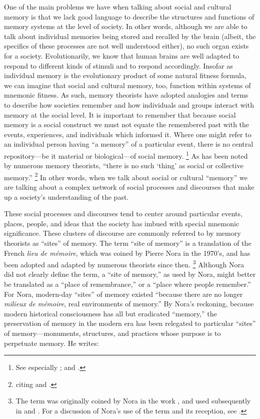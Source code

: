 One of the main problems we have when talking about social and cultural memory is that we lack good language to describe the structures and functions of memory systems at the level of society. In other words, although we are able to talk about individual memories being stored and recalled by the brain (albeit, the specifics of these processes are not well understood either), no such organ exists for a society. Evolutionarily, we know that human brains are well adapted to respond to different kinds of stimuli and to respond accordingly. Insofar as individual memory is the evolutionary product of some natural fitness formula, we can imagine that social and cultural memory, too, function within systems of mnemonic fitness.  As such, memory theorists have adopted analogies and terms to describe how societies remember and how individuals and groups interact with memory at the social level. It is important to remember that because social memory is a social construct we must not equate the remembered past with the events, experiences, and individuals which informed it. Where one might refer to an individual person having ``a memory'' of a particular event, there is no central repository---be it material or biological---of social memory.%
    \footnote{%
        See especially 
        \cite{brockmeier_cp2010}; and 
        \cite{wertsch_cp2011}.}  
As has been noted by numerous memory theorists, ``there is no such `thing' as social or collective memory.''%
    \footnote{%
        \Cite[14]{wilson2017} citing 
        \cite[112]{olick-robbins_ars1998} and 
        \cite[118--24]{wertsch_boyer-wertsch2009}.}
In other words, when we talk about social or cultural ``memory'' we are talking about a complex network of social processes and discourses that make up a society's understanding of the past.

These social processes and discourses tend to center around particular events, places, people, and ideas that the society has imbued with special mnemonic significance. These clusters of discourse are commonly referred to by memory theorists as ``sites'' of memory. The term ``site of memory'' is a translation of the French \emph{lieu de mémoire}, which was coined by Pierre Nora in the 1970's, and has been adopted and adapted by numerous theorists since then.%
    \footnote{%
        The term was originally coined by Nora in the work
        \cite*{nora_goff-etal1978}, and used subsequently in 
        \cite*{nora1984} and 
        \cite*{nora_representations1989}. For a discussion of Nora's use of the term and its reception, see 
        \cite{szpociński_teksty-drugie2016}.}
Although Nora did not clearly define the term, a ``site of memory,'' as used by Nora, might better be translated as a ``place of remembrance,'' or a ``place where people remember.'' For Nora, modern-day ``sites'' of memory existed ``because there are no longer \emph{milieux de mémoire}, real environments of memory.''%
    \autocite[7]{nora_representations1989}
By Nora's reckoning, because modern historical consciousness has all but eradicated ``memory,'' the preservation of memory in the modern era has been relegated to particular ``sites'' of memory---monuments, structures, and practices whose purpose is to perpetuate memory. He writes:

